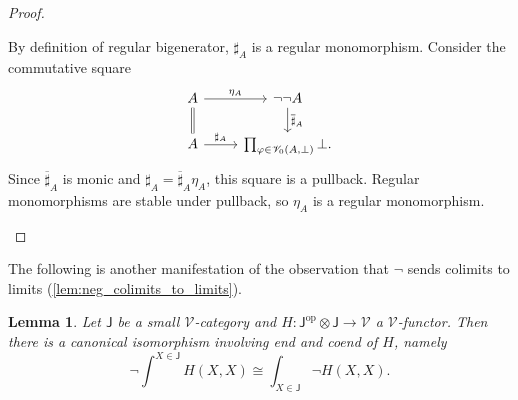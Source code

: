 \documentclass[11pt,onecolumn]{article}
\newcommand{\cV}{\mathscr{V}}
\newcommand{\cJ}{\mathsf{J}}
\newcommand{\op}{\mathrm{op}}
\theoremstyle{plain}
\newtheorem{lem}[lem]{Lemma}
\theoremstyle{remark}
\theoremstyle{definition}
\begin{document}
\begin{proof}
\begin{enumerate}
			By definition of regular bigenerator, $\sharp_A$ is a regular monomorphism.
			Consider the commutative square
			\[
				\begin{tikzcd}
					A \ar[r, "\eta_A"] \ar[d, equal] &
					\neg\neg A \ar[d, "\overline{\sharp}_A"] \\
					A \ar[r, "\sharp_A"] &
				\prod_{\varphi \in \cV_0(A,\bot)} \bot.
				\end{tikzcd}
			\]
			Since $\overline{\sharp}_A$ is monic and $\sharp_A = \overline{\sharp}_A \eta_A$, this square is a pullback.
			Regular monomorphisms are stable under pullback, so $\eta_A$ is a regular monomorphism.
			\qedhere
	\end{enumerate}
\end{proof}

The following is another manifestation of the observation that $\neg$ sends colimits to limits (\cref{lem:neg_colimits_to_limits}).

\begin{lem}
	\label{lem:neg_coends_to_ends}
	Let $\cJ$ be a small $\cV$-category and $H \colon \cJ^\op \otimes \cJ \to \cV$ a $\cV$-functor.
	Then there is a canonical isomorphism involving end and coend of $H$, namely
	\[
		\neg \int^{X \in \cJ} H(X,X)
		\cong
		\int_{X \in \cJ} \neg H(X,X).
	\]
\end{lem}
\end{document}
